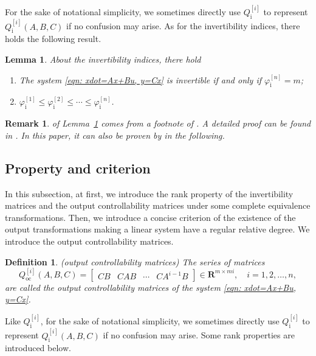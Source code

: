 \documentclass[sort&compress]{elsarticle}
\newtheorem{definition}{Definition}
\newtheorem{lemma}{Lemma}
\newtheorem{remark}{Remark}
\newcommand\faii{\varphi_\mathrm i}
\newcommand\Qi{Q_\mathrm i}
\newcommand\Qoc{Q_\mathrm{oc}}
\newcommand\R{\mathbf R}
\begin{document}
For the sake of notational simplicity,
we sometimes directly use $\Qi^{[i]}$ to represent $\Qi^{[i]}(A,B,C)$ if no confusion may arise.
As for the invertibility indices,
there holds the following result.

\begin{lemma}\label{thm: invertible indices}
\emph{\cite{Sain1969TAC[J]}}
About the invertibility indices, there hold
\begin{enumerate}
\item The system \eqref{eqn: xdot=Ax+Bu, y=Cx} is invertible
if and only if $\faii^{[n]}=m$;\label{item:inv<=>fain=m}
\item $\faii^{[1]}\le\faii^{[2]}\le\cdots\le\faii^{[n]}$.\label{item:fai1<fain}
\end{enumerate}
\end{lemma}

\begin{remark}
 of Lemma~\ref{thm: invertible indices} comes from a footnote of
\cite{Sain1969TAC[J]}.
A detailed proof can be found in \cite{Zhoubook}.
In this paper, it can also be proven by
 in the following.
\end{remark}

\subsection{Property and criterion}

In this subsection, at first, we introduce the rank property of
the invertibility matrices and the output controllability matrices
under some complete equivalence transformations.
Then, we introduce a concise criterion of the existence of
the output transformations making a linear system have a regular relative degree.
We introduce the output controllability matrices.

\begin{definition}
\emph{\cite{Zhoubook} (output controllability matrices)}
The series of matrices
\[
\Qoc^{[i]}(A,B,C)
=\begin{bmatrix}CB&CAB&\cdots&CA^{i-1}B\end{bmatrix}
\in\R^{m\times mi},
\quad i=1,2,\dots,n,
\]
are called the output controllability matrices of
the system \eqref{eqn: xdot=Ax+Bu, y=Cx}.
\end{definition}

Like $\Qi^{[i]}$, for the sake of notational simplicity,
we sometimes directly use $\Qi^{[i]}$ to represent $\Qi^{[i]}(A,B,C)$ if no confusion may arise.
Some rank properties are introduced below.
\end{document}
